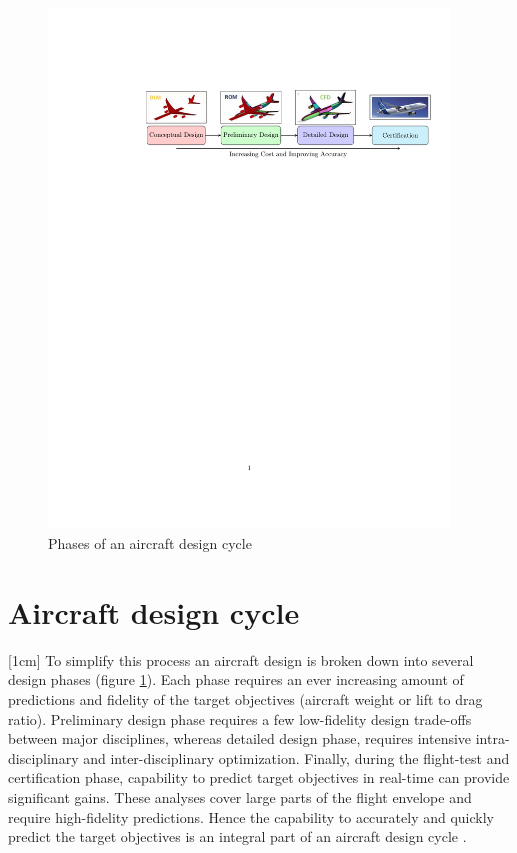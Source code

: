 \begin{figure}[!ht]
\label{figPhasesOfAircraftDesign}
  \centering
  
    \includegraphics[clip, trim=4.5cm 19cm 0.5cm 4cm,width=0.95\textwidth]
    {images/part1/aircraftDesignCycleFlowChart}
  
  \caption{Phases of an aircraft design cycle}
\end{figure}

\section{Aircraft design cycle}\label{secSircraftDesignCycle}
[1cm]
To simplify this process an aircraft design is broken down into several design phases (figure \ref{figPhasesOfAircraftDesign}). Each phase requires an ever increasing amount of predictions and fidelity of the target objectives (aircraft weight or lift to drag ratio). Preliminary design phase requires a few low-fidelity design trade-offs between major disciplines, whereas detailed design phase, requires intensive intra-disciplinary and inter-disciplinary optimization. Finally, during the flight-test and certification phase, capability to predict target objectives in real-time can provide significant gains. These analyses cover large parts of the flight envelope and require high-fidelity predictions. Hence the capability to accurately and quickly predict the target objectives is an integral part of an aircraft design cycle \cite{raymer2012aircraft}. 

